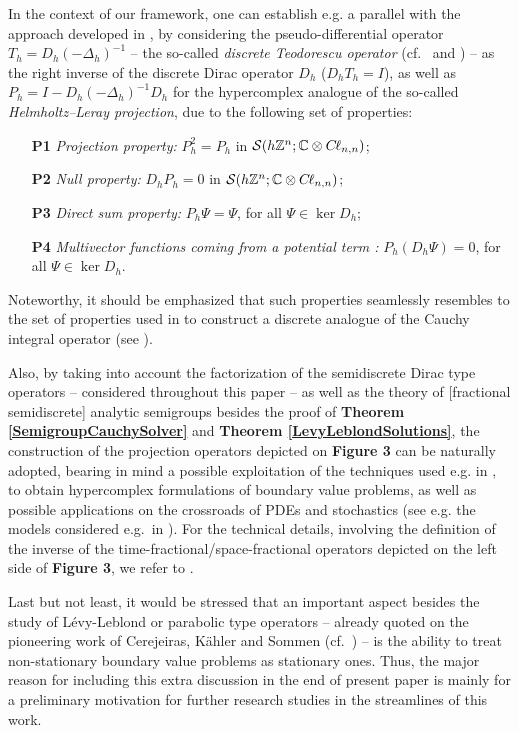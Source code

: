 \documentclass{elsarticle}
\newcommand{\BC}{{\mathbb C}}
\newcommand{\BZ}{{\mathbb Z}}
\newcommand{\cl}{C \kern -0.1em \ell}
\begin{document}
In the context of our framework, one can establish e.g. a parallel with the approach developed in \cite{faustino2006difference}, by considering the pseudo-differential operator $T_h=D_h(-\Delta_h)^{-1}$ -- the so-called {\it discrete Teodorescu operator} (cf.~\cite[p.~239]{gurlebeck1997quaternionic} and \cite[Section 5]{cerejeiras2021discrete}) -- as the right inverse of the discrete Dirac operator $D_h$ ($D_hT_h=I$), as well as $P_h=I-D_h(-\Delta_h)^{-1}D_h$ for the hypercomplex analogue of the so-called {\it Helmholtz–Leray projection}, due to the following set of properties:
\begin{itemize}
	\item[\bf P1] {\it Projection property:} $P_h^2=P_h$ in $\mathcal{S}(h\BZ^n;\BC\otimes \cl_{n,n})$;
	\item[\bf P2] {\it Null property:} $D_hP_h=0$ in $\mathcal{S}(h\BZ^n;\BC\otimes \cl_{n,n})$;
	\item[\bf P3] {\it Direct sum property:} $P_h \Psi=\Psi$, for all $\Psi \in \ker D_h$;
	\item[\bf P4] {\it Multivector functions coming from a potential term :} $P_h(D_h\Psi)=0$, for all $\Psi \in \ker D_h$.
\end{itemize}

Noteworthy, it should be emphasized that such properties seamlessly resembles to the set of properties used in \cite{gurlebeck1997quaternionic} to construct a discrete analogue of the Cauchy integral operator (see \cite[Theorem 5.3.]{gurlebeck1997quaternionic}).

Also, by taking into account the factorization of the semidiscrete Dirac type operators -- considered throughout this paper -- as well as the theory of [fractional semidiscrete] analytic semigroups besides the proof of {\bf Theorem \ref{SemigroupCauchySolver}} and {\bf Theorem \ref{LevyLeblondSolutions}}, the construction of the projection operators depicted on {\bf Figure 3} can be naturally adopted, bearing in mind a possible exploitation of the techniques used e.g. in \cite{CKS05,CFV08}, to obtain hypercomplex formulations of boundary value problems, as well as possible applications on the crossroads of PDEs and stochastics (see e.g. the models considered e.g.~in \cite{KL12,CarvalhoPlanas15,ZP17}). For the technical details, involving the definition of the inverse of the time-fractional/space-fractional operators depicted on the left side of {\bf Figure 3}, we refer to \cite[Section 26.]{SKM93}.

Last but not least, it would be stressed that an important aspect besides the study of L\'evy-Leblond or parabolic type operators -- already quoted on the pioneering work of Cerejeiras, K\"ahler and Sommen (cf.~\cite{CKS05}) -- is the ability to treat non-stationary boundary value problems as stationary ones. Thus, the major reason for including this extra discussion in the end of present paper is mainly for a preliminary motivation for further research studies in the streamlines of this work.
\end{document}
